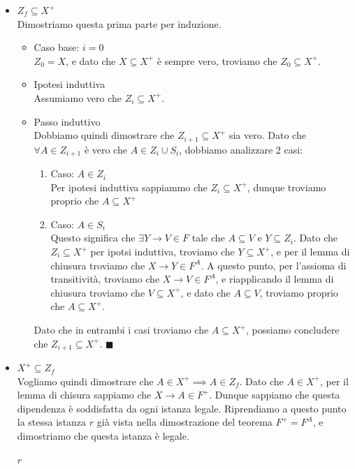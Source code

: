 \documentclass[11pt, a4paper, titlepage, oneside]{scrbook}
\begin{document}
\begin{itemize}
    \item $Z_f \subseteq X^+$ \\
    Dimostriamo questa prima parte per induzione.
    \begin{itemize}
        \item Caso base: $i = 0$ \\
        $Z_0 = X$, e dato che $X \subseteq X^+$ è sempre vero, troviamo che $Z_0 \subseteq X^+$.
        \item Ipotesi induttiva \\
        Assumiamo vero che $Z_i \subseteq X^+$.
        \item Passo induttivo \\
        Dobbiamo quindi dimostrare che $Z_{i+1} \subseteq X^+$ sia vero. Dato che $\forall A \in Z_{i+1}$ è vero che $A \in Z_i \cup S_i$, dobbiamo analizzare 2 casi:
        \begin{enumerate}[label=\arabic*°]
            \item Caso: $A \in Z_i$ \\
            Per ipotesi induttiva sappiammo che $Z_i \subseteq X^+$, dunque troviamo proprio che $A \subseteq X^+$
            \item Caso: $A \in S_i$ \\
            Questo significa che $\exists Y \longrightarrow V \in F$ tale che $A \subseteq V$ e $Y \subseteq Z_i$. Dato che $Z_i \subseteq X^+$ per ipotsi induttiva, troviamo che $Y \subseteq X^+$, e per il lemma di chiusura troviamo che $X \longrightarrow Y \in F^A$. A questo punto, per l'assioma di transitività, troviamo che $X \longrightarrow V \in F^A$, e riapplicando il lemma di chiusura troviamo che $V \subseteq X^+$, e dato che $A \subseteq V$, troviamo proprio che $A \subseteq X^+$. 
        \end{enumerate}
        Dato che in entrambi i casi troviamo che $A \subseteq X^+$, possiamo concludere che $Z_{i+1} \subseteq X^+$. $\blacksquare$
    \end{itemize}
    \item $X^+ \subseteq Z_f$ \\
    Vogliamo quindi dimostrare che $A \in X^+ \implies A \in Z_f$. Dato che $A \in X^+$, per il lemma di chisura sappiamo che $X \longrightarrow A \in F^+$. Dunque sappiamo che questa dipendenza è soddisfatta da ogni istanza legale. Riprendiamo a questo punto la stessa istanza $r$ già vista nella dimostrazione del teorema $F^+ = F^A$, e dimostriamo che questa istanza è legale.
        \begin{center}
    $r$ \nopagebreak


\end{center}
\end{itemize}
\end{document}
